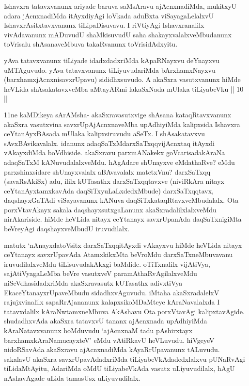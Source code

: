 \begin{artha}
Ishavxra tatavxvanunx ariyade baruva saMsAravu ajAcnxnadiMda, mukitxyU adara jAcnxnadiMda itAyxdiyAgi loVkada aduBxta viSayagaLelalxvU IshavxrAsitxtavxvanunx tiLipaDisuvavu. I riVtiyAgi Ishavxranalilx vivAdavanunx mADuvudU shaMkisuvudU saha shakayxvalalxveMbudanunx toVrisalu shAsanaveMbuva takaRvanunx toVrisidAdxyitu.
\end{artha}


\begin{artha}
yAva tatavxvanunx tiLiyade idadxdadxriMda kApaRNayxvu deYnayxvu uMTAguvudo. yAva tatavxvanunx tiLiyuvudariMda bArxhamxNayxvu (barxhamxjAcnxnisavxrUpavu) sididhxsuvudo. A akaSxra vasutxvanunx hiMde heVLida shAsakatavxveMba aMtayARmi lakaSxNada mUlaka tiLiyabeVku || 10 ||
\end{artha}

\begin{artha}
11ne kaMDikeya sArAMsha- akaSxravasutxvige shAsana kataqRtavxvanunx akaSxra vasutxvina savxrUpAjAcnxnaveMba upAdhiyiMda kalipxsida Ishavxra ceYtanAyxBAsada mUlaka kalipxsiruvudu aSeTx. I shAsakatavxvu sAvxBAvikavalalx. idanunx adaqSaTxMdarxSaTxqq\mdash vijAcnxtaq itAyxdi vAkayxdiMda boVdhiside. akaSxravu parxmANakekx goVcarisadakAraNa adaqSaTxM kANuvudalalxveMdu. hAgAdare shUnayxve eMdathaRve? eMdu parxshinxsidare shUnayxvalalx aBAvavalalx matetxVnu? darxSaTxqq (savaRsAkiSx) adu, ililx kUTasathx darxSaTxqqtavxve (niviRkAra nitayx ceYtanAyxtamxkavAda daqSiTxyuLaLxdedxMbude) darxSaTxqqtavx, daqshayxGaTAdi viSayavanunx kANuva daqSiTxkataqRtavxveMbudalalx. Ota porxVtavAkayx sakala daqshayxsutxgaLanunx akaSxradalilxlalxveMdu nirAkariside. hiMde heVLida nitayx ceYtanayx savxrUpanAda daqSaTxnigiMta beVreyAgi daqshayxveMbudU iruvudilalx. 
\end{artha}%

\begin{artha}
matutx `nAnayxdatoV\s sitx darxSaTxqq\ndash itAyxdi vAkayxvu hiMde heVLida nitayx ceYtanayx savxrUpavAda AtamxkikxMta beVroMdu darxSaTxneMbuvavanu iruvudilalxveMdu tiLisuvudakAkxgi baMdide. oTiTxnalilx vijAtiVya, sajAtiVyagaLeMba beVre vasutxveV paramAthaRvAgilalxveMdu niSeVdhasidadxriMda akaSxravasutx kUTasathx adivxtiVya EkaceYtanayxrUpaveMbudu sidadhxvAguvudu. iMtaha akaSxradalelxV rajujxvinalilx sapaRrAjananunx kalapxsikoMDaMteye kAraNavalalxda I tatavxdalilx kAraNwtamxneMbuva AkAshavu Ota porxVtavAgi kalipxtavAgide. shudadhxvAda akaSxra tatavxvU tananx ajAcnxnada upAdhiyiMda kAraNatavxvanunx hoMduvudu `ajAcnxnaM tadu pAshirxtayx barxhamxkAraNamucayxteV' eMdu vAtiRkavU heVLuvudu. hiVgeyeV nidoRSavAda akaSxravu ajAcnxnadiMda kAyaRrUpavanunx tALuvudu. sakalavU akaSxra savxrUpavAdadxriMda tiLiyabeVkAdadedxlalxvu pUNaRvAgi tiLidaMtAyitu, AdariMda oMdU tiLiyabeVkAda vasutx uLiyuvudilalx, hAgU nAshavAgade uLida tamasUsx uLiyuvudilalx.
\end{artha}%

